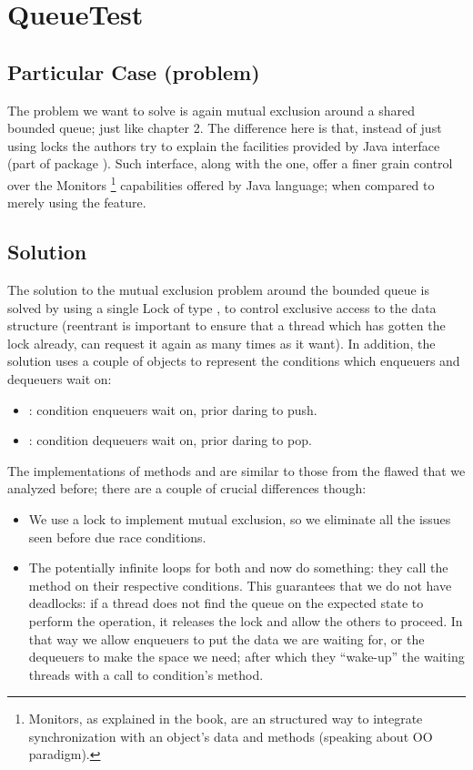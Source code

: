 \newpage
\section{\textbf{QueueTest}}

\subsection{Particular Case (problem)}
The problem we want to solve is again mutual exclusion around a shared
bounded queue; just like chapter 2. The difference here is that, instead of
just using locks the authors try to explain the facilities provided by
Java  interface (part of package
). Such interface, along with the
 one, offer a finer grain control over the
Monitors \footnote{Monitors, as explained in the book, are an
  structured way to integrate synchronization with an object's data
  and methods (speaking about OO paradigm).}
capabilities offered by Java language; when compared to merely using
the  feature. 

\subsection{Solution}
The solution to the mutual exclusion problem around the bounded queue is
solved by using a single Lock of type , to control
exclusive access to the data structure (reentrant is important to
ensure that a thread which has gotten the lock already, can request it
again as many times as it want). In addition, the solution uses a
couple of  objects to represent the conditions 
which enqueuers and dequeuers wait on: \\

\begin{itemize}
  \item {}: condition enqueuers wait on, prior daring to push.
  \item {}: condition dequeuers wait on, prior daring to pop.
\end{itemize}
\hfill

The implementations of methods  and  are similar to
those from the flawed  that we analyzed before; there
are a couple of crucial differences though: \\

\begin{itemize}
\item We use a lock to implement mutual exclusion, so we eliminate all
  the issues seen before due race conditions.
\item The potentially infinite loops for both  and  now
  do something: they call the  method on their respective
  conditions. This guarantees that we do not have deadlocks: if a
  thread does not find the queue on the expected state to perform the
  operation, it releases the lock and allow the others to proceed. In
  that way we allow enqueuers to put the data we are waiting for, or
  the dequeuers to make the space we need; after which they
  ``wake-up'' the waiting threads with a call to condition's
   method. 
\end{itemize}
\hfill

